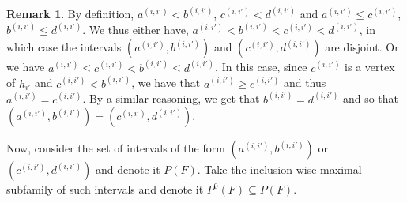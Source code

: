 \documentclass[12pt]{article}
\theoremstyle{definition}
\newtheorem{rmk}[thm]{Remark}
\def\rxone{1.0/2}
\def\ryone{0.7/2}
\def\rxonepoint{1.5/2}
\def\ryonepoint{0.9/2}
\def\rxtwo{2.0/2}
\def\rytwo{1.3/2}
\def\rxfivepoint{5.5/2}
\def\ryfivepoint{3.0/2}
\begin{document}
\begin{figure}[ht]
\begin{center}
{
     }
     \end{center}
     \caption{}
     \label{figure:overlap}
     \end{figure} 

     \begin{rmk} \label{rmk:disj}
      By definition,
     $a^{\left(i, i'\right)} < b^{\left(i, i'\right)}$,
     $c^{\left(i, i'\right)} < d^{\left(i,i'\right)}$ 
     and $a^{\left(i, i'\right)} 
     \leq c^{\left(i, i'\right)}$,
     $b^{\left(i, i'\right)}
     \leq d^{\left(i, i'\right)}$.
     We thus either have, 
     $a^{\left(i, i'\right)} < 
     b^{\left(i, i'\right)} <
     c^{\left(i, i'\right)} < 
     d^{\left(i, i'\right)}$,
     in which case
     the intervals
     $\left(a^{\left(i, i'\right)},
     b^{\left(i,i'\right)}\right)$ 
     and
     $\left(c^{\left(i, i'\right)},
     d^{\left(i,i'\right)}\right)$
     are disjoint.
     Or we have
     $a^{\left(i,i'\right)} 
     \leq c^{\left(i, i'\right)}
     < b^{\left(i, i'\right)}
     \leq d^{\left(i, i'\right)}$.
     In this case, 
     since $c^{\left(i, i'\right)}$ 
     is a vertex of
     $h_{i'}$ and
     $c^{\left(i, i'\right)}
     < b^{\left(i, i'\right)}$, 
     we have that
     $a^{\left(i, i'\right)}
     \geq c^{\left(i,i'\right)}$ 
     and thus 
     $a^{\left(i, i'\right)}
     = c^{\left(i,i'\right)}$.
     By a similar
     reasoning, we get
     that $b^{\left(i,i'\right)}
     = d^{\left(i, i'\right)}$
     and so that
     $\left(a^{\left(i,i'\right)},
     b^{\left(i, i'\right)}\right) =
     \left(c^{\left(i,i'\right)},
     d^{\left(i, i'\right)}
     \right)$.
     \end{rmk}   

     Now, consider the set of intervals
     of the form $\left(a^{\left(i,i'\right)},
     b^{\left(i,i'\right)}\right)$ 
     or $\left(c^{\left(i, i'\right)},
     d^{\left(i, i'\right)}\right)$
     and denote it $P\left(F\right)$.
     Take the inclusion-wise maximal
     subfamily of such intervals
     and denote it $P^{0}\left(F\right)
     \subseteq P\left(F\right)$.
     
\end{document}
